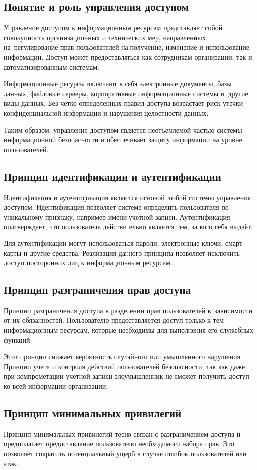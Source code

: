 \documentclass{ou}
\begin{document}
\subsection{Понятие и роль управления доступом }
Управление доступом к информационным ресурсам представляет собой 
совокупность организационных и технических мер, направленных на~регулирование прав пользователей на получение, изменение и использование 
информации. Доступ может предоставляться как сотрудникам организации, так и 
автоматизированным системам. 

Информационные ресурсы включают в себя электронные документы, базы 
данных, файловые серверы, корпоративные информационные системы и~другие 
виды данных. Без чётко определённых правил доступа возрастает риск утечки 
конфиденциальной информации и нарушения целостности данных. 

Таким образом, управление доступом является неотъемлемой частью системы 
информационной безопасности и обеспечивает защиту информации на уровне 
пользователей. 
\subsection{Принцип идентификации и аутентификации}
Идентификация и аутентификация являются основой любой системы управления 
доступом. Идентификация позволяет системе определить пользователя по 
уникальному признаку, например имени учетной записи. Аутентификация 
подтверждает, что пользователь действительно является тем, за кого себя выдаёт.

Для аутентификации могут использоваться пароли, электронные ключи, смарт
карты и другие средства. Реализация данного принципа позволяет исключить 
доступ посторонних лиц к информационным ресурсам. 
\subsection{Принцип разграничения прав доступа}
Принцип разграничения доступа в разделении прав пользователей в~зависимости от их обязанностей. Пользователю предоставляется доступ только к 
тем информационным ресурсам, которые необходимы для выполнения его 
служебных функций. 

Этот принцип снижает вероятность случайного или умышленного нарушения 
Принцип учета и контроля действий пользователей 
безопасности, так как даже при компрометации учетной записи злоумышленник 
не сможет получить доступ ко всей информации организации. 
\subsection{Принцип минимальных привилегий} 
Принцип минимальных привилегий тесно связан с разграничением доступа и 
предполагает предоставление пользователю необходимого набора 
прав. Это позволяет сократить потенциальный ущерб в случае ошибок 
пользователей или атак. 
\end{document}
